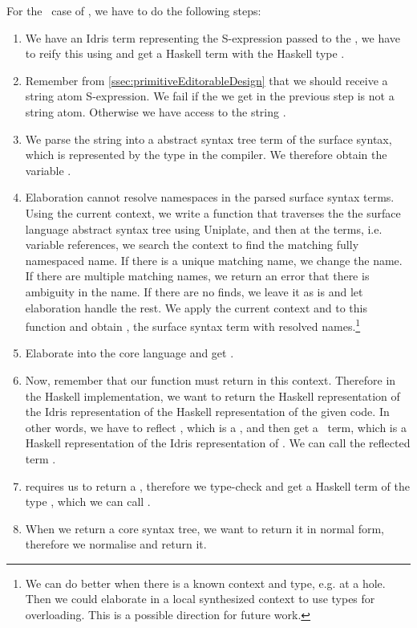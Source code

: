 For the \TT\ case of , we have to do the following steps:
\begin{enumerate}
  \item We have an Idris term  representing the S-expression passed to
    the , we have to reify this using  and
    get a Haskell term with the Haskell type .
  \item Remember from \autoref{ssec:primitiveEditorableDesign} that we should
    receive a string atom S-expression. We fail if the  we get in the
    previous step is not a string atom. Otherwise we have access to the string
    .
  \item We parse the string  into a abstract syntax tree term  of
    the surface syntax, which is represented by the type  in the
    compiler. We therefore obtain the variable .
  \item Elaboration cannot resolve namespaces in the parsed surface syntax
    terms.  Using the current context, we write a function
    that traverses the the surface language abstract syntax tree using
    Uniplate\cite{uniplate}, and then at the  terms, i.e. variable
    references, we search the context to find the matching fully namespaced
    name. If there is a unique matching name, we change the name. If there are multiple
    matching names, we return an error that there is ambiguity in the name. If there are
    no finds, we leave it as is and let elaboration handle the rest.
    We apply the current context and  to this function and obtain
    , the surface syntax term with resolved names.\footnote{
     We can do better when there is a known context and type, e.g. at a hole.
     Then we could elaborate in a local synthesized context to use types for
     overloading. This is a possible direction for future work.}
  \item Elaborate  into the core language and get .
  \item Now, remember that our function  must return
     in this context. Therefore in the Haskell implementation, we
    want to return the Haskell representation of the Idris representation of
    the Haskell representation of the given code. In other words, we have to
    reflect , which is a , and then get a \Raw\ term, which
    is a Haskell representation of the Idris representation of .
    We can call the reflected term .
  \item {} requires us to return a , therefore we
    type-check  and get a Haskell term of the type ,
    which we can call .
  \item When we return a core syntax tree, we want to return it in normal form,
    therefore we normalise  and return it.
\end{enumerate}

